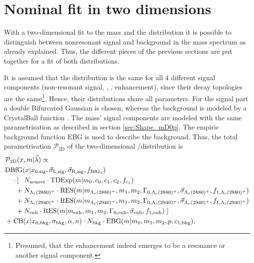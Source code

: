 \section{Nominal fit in two dimensions}
\label{sec:Fit_2D}
With a two-dimensional fit to the \Dz\proton mass and the \logIP distribution it is possible to distinguish between nonresonant signal and background in the \Dz\proton mass spectrum as already explained.
Thus, the different pieces of the previous sections are put together for a fit of both distributions.

It is assumed that the \logIP distribution is the same for all 4 different signal components (non-resonant signal, \LcResI, \LcResII, enhancement), since their decay topologies are the same\footnote{Presumed, that the enhancement indeed emerges to be a resonance or another signal component.}.
Hence, their \logIP distributions share all parameters. 
For the \logIP signal part a double Bifurcated Gaussian \DBfG is chosen, whereas the background is modeled by a CrystalBall function \CB.
The \Dz\proton mass' signal components are modeled with the same parametrisation as described in section \ref{sec:Shape_mD0p}. 
The empiric background function EBG is used to describe the background.
Thus, the total parametrisation $\mathcal{P}_\text{2D}$ of the two-dimensional \logIP/\MDp distribution is
\begin{align}
    & \mathcal{P}_\text{2D}(x, m | \vec{\lambda}) \propto \nonumber \\
    & \text{DBfG}(x|x_{0, \text{sig}}, \vec{\sigma}_{\text{L,sig}}, \vec{\sigma}_{\text{R,sig}}, f_{\text{BfG}_1}) \nonumber \\
    & \quad \cdot \left[\phantom{+} N_\text{nonres} \cdot \text{TDExp}(m|m_0, c_0, c_1, c_2, f_{c_1}) \right. \nonumber \\
    & \quad \phantom{\cdot [} + N_{{\Lambda}_{c}(2880)^+} \cdot \text{RES}(m| m_{{\Lambda}_{c}(2880)^+}, m_1, m_2, \Gamma_{0, {\Lambda}_{c}(2880)^+}, \vec{\sigma}_{{\Lambda}_{c}(2880)^+}, f_{1, {\Lambda}_{c}(2880)^+}) \nonumber \\
    & \quad \phantom{\cdot [} + N_{{\Lambda}_{c}(2940)^+} \cdot \text{RES}(m| m_{{\Lambda}_{c}(2940)^+}, m_1, m_2, \Gamma_{0, {\Lambda}_{c}(2940)^+}, \vec{\sigma}_{{\Lambda}_{c}(2940)^+}, f_{1, {\Lambda}_{c}(2940)^+}) \nonumber \\
    & \quad \phantom{\cdot [} + N_\text{enh} \cdot \text{RES}(m| m_\text{enh}, m_1, m_2, \Gamma_{0, \text{enh}}, \vec{\sigma}_{\text{enh}}, f_{1, \text{enh}})\left.\right] \nonumber \\
    & + \text{CB}(x| x_{0, \text{bkg}}, \sigma_\text{bkg}, \alpha, n) \cdot N_\text{bkg} \cdot \text{EBG}(m|m_0, m_1, m_2, p,c_{1, \text{bkg}}),
\end{align}
